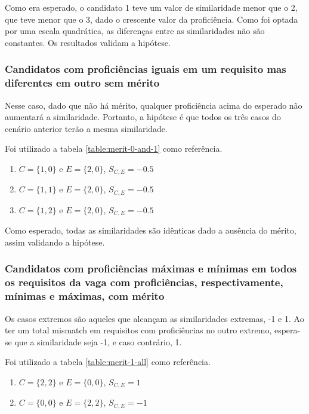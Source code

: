 \documentclass[preprint,12pt]{elsarticle}
\begin{document}
Como era esperado, o candidato 1 teve um valor de similaridade menor que o 2, que teve menor que o 3, dado o crescente valor da proficiência. Como foi optada por uma escala quadrática, as diferenças entre as similaridades não são constantes. Os resultados validam a hipótese.

\subsubsection{Candidatos com proficiências iguais em um requisito mas diferentes em outro sem mérito}

Nesse caso, dado que não há mérito, qualquer proficiência acima do esperado não aumentará a similaridade. Portanto, a hipótese é que todos os três casos do cenário anterior terão a mesma similaridade.

Foi utilizado a tabela \ref{table:merit-0-and-1} como referência.

\begin{enumerate}
    \item $C = \{1,0\}$ e $E = \{2,0\}$, $S_{C,E} = -0.5$
    \item $C = \{1,1\}$ e $E = \{2,0\}$, $S_{C,E} = -0.5$
    \item $C = \{1,2\}$ e $E = \{2,0\}$, $S_{C,E} = -0.5$
\end{enumerate}

Como esperado, todas as similaridades são idênticas dado a ausência do mérito, assim validando a hipótese.

\subsubsection{Candidatos com proficiências máximas e mínimas em todos os requisitos da vaga com proficiências, respectivamente, mínimas e máximas, com mérito}

Os casos extremos são aqueles que alcançam as similaridades extremas, -1 e 1. Ao ter um total mismatch em requisitos com proficiências no outro extremo, espera-se que a similaridade seja -1, e caso contrário, 1.

Foi utilizado a tabela \ref{table:merit-1-all} como referência.

\begin{enumerate}
    \item $C = \{2,2\}$ e $E = \{0,0\}$, $S_{C,E} = 1$
    \item $C = \{0,0\}$ e $E = \{2,2\}$, $S_{C,E} = -1$
\end{enumerate}
\end{document}
